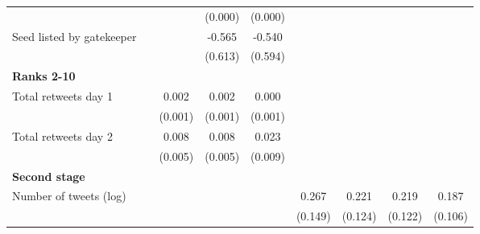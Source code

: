{\begin{tabular}{l*{8}{c}}
                    &                     &                     &     (0.000)         &     (0.000)         &                     &                     &                     &                     \\
Seed listed by gatekeeper&                     &                     &      -0.565         &      -0.540         &                     &                     &                     &                     \\
                    &                     &                     &     (0.613)         &     (0.594)         &                     &                     &                     &                     \\
\textbf{Ranks 2-10} &                     &                     &                     &                     &                     &                     &                     &                     \\
Total retweets day 1&                     &       0.002\sym{**} &       0.002\sym{**} &       0.000         &                     &                     &                     &                     \\
                    &                     &     (0.001)         &     (0.001)         &     (0.001)         &                     &                     &                     &                     \\
Total retweets day 2&                     &       0.008         &       0.008         &       0.023\sym{**} &                     &                     &                     &                     \\
                    &                     &     (0.005)         &     (0.005)         &     (0.009)         &                     &                     &                     &                     \\
\textbf{Second stage}&                     &                     &                     &                     &                     &                     &                     &                     \\
Number of tweets (log)&                     &                     &                     &                     &       0.267\sym{*}  &       0.221\sym{*}  &       0.219\sym{*}  &       0.187\sym{*}  \\
                    &                     &                     &                     &                     &     (0.149)         &     (0.124)         &     (0.122)         &     (0.106)         \\

\end{tabular}}
